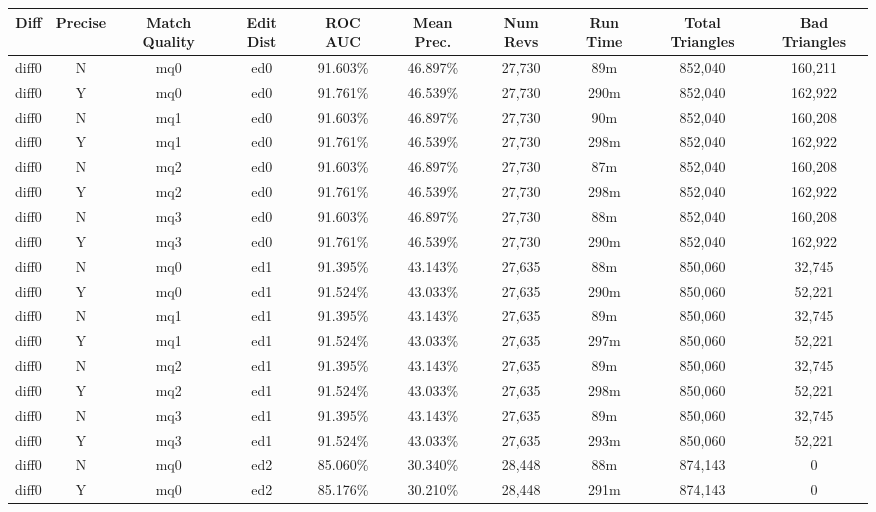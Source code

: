 \begin{sidewaystable}[!tp]
  \begin{center}
    \begin{tabular}{|c|c|c|c||c|c||c|c|c|c|}
\hline
Diff & Precise & Match Quality & Edit Dist
        & ROC AUC & Mean Prec.
        & Num Revs & Run Time
        & Total Triangles & Bad Triangles \\
\hline
\hline
diff0 & N & mq0 & ed0 & 91.603\% & 46.897\% & 27,730 & 89m & 852,040 & 160,211 \\
diff0 & Y & mq0 & ed0 & 91.761\% & 46.539\% & 27,730 & 290m & 852,040 & 162,922 \\
diff0 & N & mq1 & ed0 & 91.603\% & 46.897\% & 27,730 & 90m & 852,040 & 160,208 \\
diff0 & Y & mq1 & ed0 & 91.761\% & 46.539\% & 27,730 & 298m & 852,040 & 162,922 \\
diff0 & N & mq2 & ed0 & 91.603\% & 46.897\% & 27,730 & 87m & 852,040 & 160,208 \\
diff0 & Y & mq2 & ed0 & 91.761\% & 46.539\% & 27,730 & 298m & 852,040 & 162,922 \\
diff0 & N & mq3 & ed0 & 91.603\% & 46.897\% & 27,730 & 88m & 852,040 & 160,208 \\
diff0 & Y & mq3 & ed0 & 91.761\% & 46.539\% & 27,730 & 290m & 852,040 & 162,922 \\
diff0 & N & mq0 & ed1 & 91.395\% & 43.143\% & 27,635 & 88m & 850,060 & 32,745 \\
diff0 & Y & mq0 & ed1 & 91.524\% & 43.033\% & 27,635 & 290m & 850,060 & 52,221 \\
diff0 & N & mq1 & ed1 & 91.395\% & 43.143\% & 27,635 & 89m & 850,060 & 32,745 \\
diff0 & Y & mq1 & ed1 & 91.524\% & 43.033\% & 27,635 & 297m & 850,060 & 52,221 \\
diff0 & N & mq2 & ed1 & 91.395\% & 43.143\% & 27,635 & 89m & 850,060 & 32,745 \\
diff0 & Y & mq2 & ed1 & 91.524\% & 43.033\% & 27,635 & 298m & 850,060 & 52,221 \\
diff0 & N & mq3 & ed1 & 91.395\% & 43.143\% & 27,635 & 89m & 850,060 & 32,745 \\
diff0 & Y & mq3 & ed1 & 91.524\% & 43.033\% & 27,635 & 293m & 850,060 & 52,221 \\
diff0 & N & mq0 & ed2 & 85.060\% & 30.340\% & 28,448 & 88m & 874,143 & 0 \\
diff0 & Y & mq0 & ed2 & 85.176\% & 30.210\% & 28,448 & 291m & 874,143 & 0 \\

\end{tabular}
\end{center}
\end{sidewaystable}
